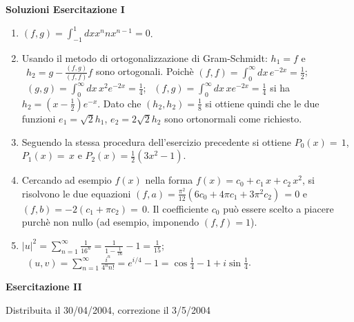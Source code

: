 \documentclass[a4paper,10pt]{article}
\begin{document}
\centerline{\LARGE \bf Soluzioni Esercitazione I}
\begin{enumerate}
\item $(f,g) = \int_{-1}^1 dx x^n n x^{n-1} = 0$.
\item  Usando
il metodo di ortogonalizzazione di Gram-Schmidt:
$h_1 = f$ e $\ \ h_2 = g - \frac{(f,g)}{(f,f)} f $ sono ortogonali. Poich\`{e} $(f,f) = \int_0^\infty dx \, e^{-2x} = \frac12$; $\ \ (g,g) = \int_0^\infty dx \, x^2 e^{-2x}=\frac14$;
$\ \ (f,g)=\int_0^\infty dx \, x e^{-2x} = \frac14$ si ha $h_2= \left( x - \frac12 \right) e^{-x}$.
Dato che $(h_2,h_2)=\frac18$ si ottiene quindi che le due funzioni $e_1 = \sqrt{2} h_1$, $e_2 = 2 \sqrt{2} h_2$ sono ortonormali come richiesto.
\item Seguendo la stessa procedura dell'esercizio precedente si ottiene $P_0(x)=\,1$,
$P_1(x)=\,x$ e $P_2(x)=\frac12 \left(3x^2 -1\right)$.
\item Cercando ad esempio $f(x)$ nella forma $f(x) = c_0+c_1\,x+c_2\,x^2$, si risolvono le due equazioni
$(f,a) = \frac{\pi^2}{12}( 6c_0+4\pi c_1+3\pi^2 c_2)\,= 0 $ e
$(f,b) = -2(c_1+\pi c_2) =\,0$. Il coefficiente $c_0$ pu\`o essere scelto a piacere purch\`e non nullo
(ad esempio, imponendo $(f,f)=1$).
\item $|u|^2 = \sum_{n=1}^\infty \frac1{16^n} = \frac1{1-\frac1{16}}-1=\frac1{15}$;
$ \ \ (u,v) = \sum_{n=1}^\infty \frac{i^n}{4^n n!} = e^{i/4}-1= \cos \frac14 -1 +i \sin \frac14$.
\end{enumerate}

\newpage

\centerline{\LARGE \bf Esercitazione II}
\centerline{Distribuita il 30/04/2004, correzione il 3/5/2004}
\end{document}
